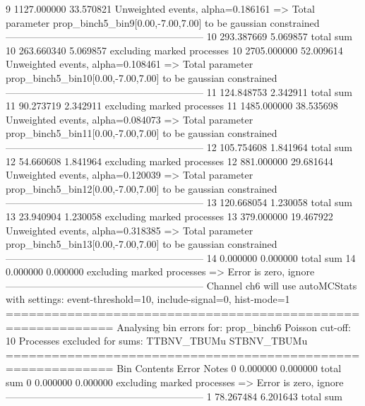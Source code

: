 9          1127.000000     33.570821       Unweighted events, alpha=0.186161
  => Total parameter prop_binch5_bin9[0.00,-7.00,7.00] to be gaussian constrained
------------------------------------------------------------
10         293.387669      5.069857        total sum                     
10         263.660340      5.069857        excluding marked processes    
10         2705.000000     52.009614       Unweighted events, alpha=0.108461
  => Total parameter prop_binch5_bin10[0.00,-7.00,7.00] to be gaussian constrained
------------------------------------------------------------
11         124.848753      2.342911        total sum                     
11         90.273719       2.342911        excluding marked processes    
11         1485.000000     38.535698       Unweighted events, alpha=0.084073
  => Total parameter prop_binch5_bin11[0.00,-7.00,7.00] to be gaussian constrained
------------------------------------------------------------
12         105.754608      1.841964        total sum                     
12         54.660608       1.841964        excluding marked processes    
12         881.000000      29.681644       Unweighted events, alpha=0.120039
  => Total parameter prop_binch5_bin12[0.00,-7.00,7.00] to be gaussian constrained
------------------------------------------------------------
13         120.668054      1.230058        total sum                     
13         23.940904       1.230058        excluding marked processes    
13         379.000000      19.467922       Unweighted events, alpha=0.318385
  => Total parameter prop_binch5_bin13[0.00,-7.00,7.00] to be gaussian constrained
------------------------------------------------------------
14         0.000000        0.000000        total sum                     
14         0.000000        0.000000        excluding marked processes    
  => Error is zero, ignore      
------------------------------------------------------------
Channel ch6 will use autoMCStats with settings: event-threshold=10, include-signal=0, hist-mode=1
============================================================
Analysing bin errors for: prop_binch6
Poisson cut-off: 10
Processes excluded for sums: TTBNV_TBUMu STBNV_TBUMu
============================================================
Bin        Contents        Error           Notes                         
0          0.000000        0.000000        total sum                     
0          0.000000        0.000000        excluding marked processes    
  => Error is zero, ignore      
------------------------------------------------------------
1          78.267484       6.201643        total sum                     
